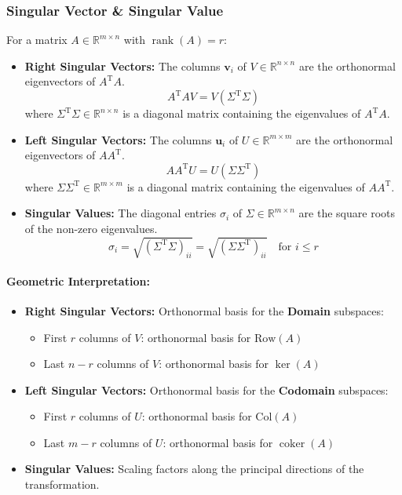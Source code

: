 \documentclass{article}
\begin{document}
\subsubsection{Singular Vector \& Singular Value}
For a matrix $A \in \mathbb{R}^{m \times n}$ with $\operatorname{rank}(A) = r$:

\begin{itemize}
    \item \textbf{Right Singular Vectors:} The columns $\mathbf{v}_i$ of $V \in \mathbb{R}^{n \times n}$ are the orthonormal eigenvectors of $A^{\mathrm{T}} A$.
    \[
        A^{\mathrm{T}} A V = V (\Sigma^{\mathrm{T}} \Sigma)
    \]
    where $\Sigma^{\mathrm{T}} \Sigma \in \mathbb{R}^{n \times n}$ is a diagonal matrix containing the eigenvalues of $A^{\mathrm{T}} A$.

    \item \textbf{Left Singular Vectors:} The columns $\mathbf{u}_i$ of $U \in \mathbb{R}^{m \times m}$ are the orthonormal eigenvectors of $AA^{\mathrm{T}}$.
    \[
        AA^{\mathrm{T}} U = U (\Sigma \Sigma^{\mathrm{T}})
    \]
    where $\Sigma \Sigma^{\mathrm{T}} \in \mathbb{R}^{m \times m}$ is a diagonal matrix containing the eigenvalues of $AA^{\mathrm{T}}$.

    \item \textbf{Singular Values:} The diagonal entries $\sigma_i$ of $\Sigma \in \mathbb{R}^{m \times n}$ are the square roots of the non-zero eigenvalues.
    \[
        \sigma_i = \sqrt{(\Sigma^{\mathrm{T}} \Sigma)_{ii}} = \sqrt{(\Sigma \Sigma^{\mathrm{T}})_{ii}} \quad \text{for } i \le r
    \]
\end{itemize}

\paragraph{Geometric Interpretation:}
\begin{itemize}
    \item \textbf{Right Singular Vectors:} Orthonormal basis for the \textbf{Domain} subspaces:
        \begin{itemize}
            \item First $r$ columns of $V$: orthonormal basis for $\text{Row}(A)$
            \item Last $n-r$ columns of $V$: orthonormal basis for $\ker(A)$
        \end{itemize}
    \item \textbf{Left Singular Vectors:} Orthonormal basis for the \textbf{Codomain} subspaces:
        \begin{itemize}
            \item First $r$ columns of $U$: orthonormal basis for $\text{Col}(A)$
            \item Last $m-r$ columns of $U$: orthonormal basis for $\operatorname{coker}(A)$
        \end{itemize}
    \item \textbf{Singular Values:} Scaling factors along the principal directions of the transformation.
\end{itemize}
\end{document}
